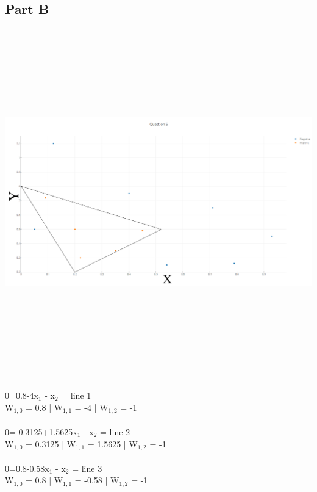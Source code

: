 \documentclass{article}
\begin{document}
\subsection{Part B}
\includegraphics[width=15cm,height=15cm,keepaspectratio]{"Question5a"}
\\
\\
0=0.8-4x$_{1}$ - x$_{2}$ = line 1
\\
W$_{1,0}$ = 0.8  | W$_{1,1}$ = -4  |  W$_{1,2}$ = -1
\\
\\
0=-0.3125+1.5625x$_{1}$ - x$_{2}$ = line 2
\\
W$_{1,0}$ = 0.3125  | W$_{1,1}$ = 1.5625  |  W$_{1,2}$ = -1
\\
\\
0=0.8-0.58x$_{1}$ - x$_{2}$ = line 3
\\
W$_{1,0}$ = 0.8  | W$_{1,1}$ = -0.58  |  W$_{1,2}$ = -1
\end{document}
